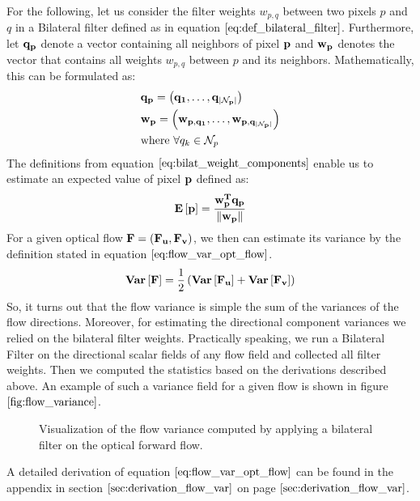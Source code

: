 For the following, let us consider the filter weights $w_{p,q}$ between two pixels $p$ and $q$ in a Bilateral filter defined as in equation $\ref{eq:def_bilateral_filter}$. Furthermore, let $\bf{q}_p$ denote a vector containing all neighbors of pixel $\bf{p}$ and $\bf{w}_p$ denotes the vector that contains all weights $w_{p,q}$ between $p$ and its neighbors. Mathematically, this can be formulated as:
\begin{equation}
\begin{aligned}
& \bf{q_p} = \left( q_1, \dots, q_{|\mathcal{N}_p|} \right) \\
& \bf{w_p} = \left( w_{p, q_1}, \dots, w_{p, q_{|\mathcal{N}_p|}} \right) \\
& \text{where } \forall q_k \in \mathcal{N}_p
\end{aligned}
\label{eq:bilat_weight_components}
\end{equation}
The definitions from equation $\ref{eq:bilat_weight_components}$ enable us to estimate an expected value of pixel $\bf{p}$ defined as:
\begin{equation}
	\mathbf{E} \left[ \bf{p} \right] = \frac{\bf{w}_{p}^{T} \bf{q}_p}{\left\lVert\bf{w}_{p}\right\rVert}
\end{equation}
For a given optical flow $\bf{F} = (\bf{F_u}, \bf{F_v})$, we then can estimate its variance by the definition stated in equation $\ref{eq:flow_var_opt_flow}$.
\begin{equation}
	\mathbf{Var} \left[ \bf{F} \right] = \frac{1}{2} \left( \mathbf{Var} \left[ \bf{F_u} \right] + \mathbf{Var} \left[ \bf{F_v} \right] \right)
\label{eq:flow_var_opt_flow}	
\end{equation}
So, it turns out that the flow variance is simple the sum of the variances of the flow directions. Moreover, for estimating the directional component variances we relied on the bilateral filter weights. Practically speaking, we run a Bilateral Filter on the directional scalar fields of any flow field and collected all filter weights. Then we computed the statistics based on the derivations described above. An example of such a variance field for a given flow is shown in figure $\ref{fig:flow_variance}$.
\begin{figure}[H]
\begin{center}
\end{center}
\caption[Flow Variance]{Visualization of the flow variance computed by applying a bilateral filter on the optical forward flow.}
\label{fig:flow_variance}
\end{figure}
A detailed derivation of equation $\ref{eq:flow_var_opt_flow}$ can be found in the appendix in section $\ref{sec:derivation_flow_var}$ on page $\pageref{sec:derivation_flow_var}$.

